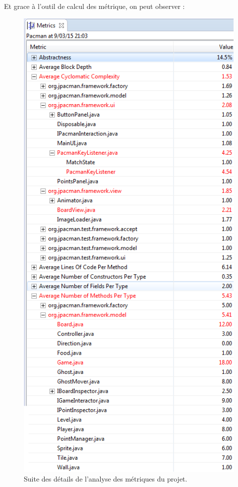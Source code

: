 \documentclass[12pt,a4paper,final]{article}
\begin{document}
Et grace à l'outil de calcul des métrique, on peut observer : 
\begin{figure}[!h]
	\centering
	\includegraphics[width=\textwidth]{Metrique.png}
	\caption{\label{métrique0}Suite des détails de l'analyse des métriques du projet.}
\end{figure}
\end{document}
